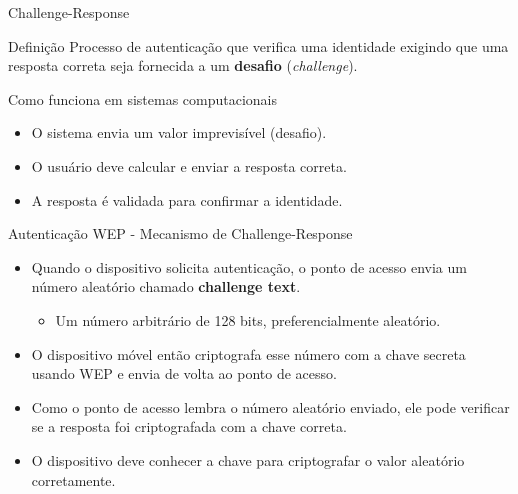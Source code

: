 \begin{frame}{Challenge-Response}
    \begin{block}{Definição}
        Processo de autenticação que verifica uma identidade exigindo que uma resposta correta seja fornecida a um \textbf{desafio} (\textit{challenge}).
    \end{block}

    \begin{block}{Como funciona em sistemas computacionais}
        \begin{itemize}
            \item O sistema envia um valor imprevisível (desafio).
            \item O usuário deve calcular e enviar a resposta correta.
            \item A resposta é validada para confirmar a identidade.
        \end{itemize}
    \end{block}
\end{frame}


\begin{frame}{Autenticação WEP - Mecanismo de Challenge-Response}



    \begin{itemize}
        \item Quando o dispositivo solicita autenticação, o ponto de acesso envia um número aleatório chamado \textbf{challenge text}.
              \begin{itemize}
                  \item Um número arbitrário de 128 bits, preferencialmente aleatório.
              \end{itemize}
    \end{itemize}



    \begin{itemize}
        \item O dispositivo móvel então criptografa esse número com a chave secreta usando WEP e envia de volta ao ponto de acesso.
        \item Como o ponto de acesso lembra o número aleatório enviado, ele pode verificar se a resposta foi criptografada com a chave correta.
        \item O dispositivo deve conhecer a chave para criptografar o valor aleatório corretamente.
    \end{itemize}



\end{frame}


